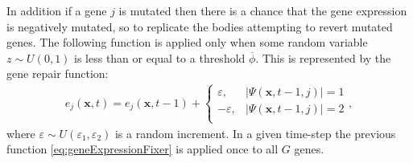 \documentclass[\main/thesis.tex]{subfiles}
\begin{document}
In addition if a gene $j$ is mutated then there is a chance that the gene 
expression is negatively mutated, so to replicate the bodies
attempting to revert mutated genes. The following function is applied only when 
some random variable $z {\sim} U(0,1)$ is less than or equal to a threshold $\overline{\phi}$.
This is represented by the gene repair function:
\begin{align}
e_j(\boldsymbol{x}, t) {=} e_j(\boldsymbol{x}, t{-}1) {+}
\begin{cases}
    \varepsilon, 
      & |\Psi(\boldsymbol{x}, t{-}1, j)| {=} 1 \\
    {-} \varepsilon, 
      & |\Psi(\boldsymbol{x}, t{-}1, j)| {=} 2 \\
\end{cases},
\label{eq:geneExpressionFixer}
\end{align}
where $\varepsilon {\sim} U(\varepsilon_1, \varepsilon_2)$ is a random increment.  
In a given time-step the previous function \eqref{eq:geneExpressionFixer} is applied once to all $G$ genes.
\end{document}
